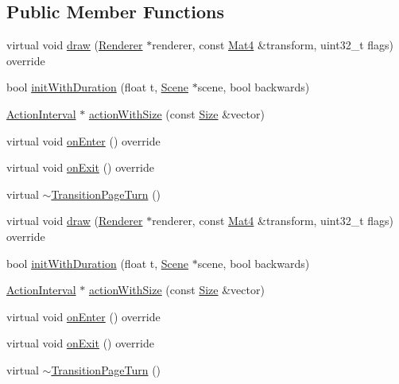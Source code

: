 \subsection*{Public Member Functions}
\begin{DoxyCompactItemize}
\item 
virtual void \hyperlink{classTransitionPageTurn_a1e00260a163de7b41a5827ee9ed34d61}{draw} (\hyperlink{classRenderer}{Renderer} $\ast$renderer, const \hyperlink{classMat4}{Mat4} \&transform, uint32\+\_\+t flags) override
\item 
bool \hyperlink{classTransitionPageTurn_ac01d675bea315c040164639f912401d7}{init\+With\+Duration} (float t, \hyperlink{classScene}{Scene} $\ast$scene, bool backwards)
\item 
\hyperlink{classActionInterval}{Action\+Interval} $\ast$ \hyperlink{classTransitionPageTurn_a5de2062024b8a0dc293d1e4d7b2d8d2a}{action\+With\+Size} (const \hyperlink{classSize}{Size} \&vector)
\item 
virtual void \hyperlink{classTransitionPageTurn_a451cf478d1f344678dde975e0db39b46}{on\+Enter} () override
\item 
virtual void \hyperlink{classTransitionPageTurn_a5c53ecc8cf81db631e7af1c5fa12d942}{on\+Exit} () override
\item 
virtual \hyperlink{classTransitionPageTurn_a96f393e4df05d5a4c9c97daeeecd58d7}{$\sim$\+Transition\+Page\+Turn} ()
\item 
virtual void \hyperlink{classTransitionPageTurn_a2df5e0dc13a58e5ac7c8ce27703bd384}{draw} (\hyperlink{classRenderer}{Renderer} $\ast$renderer, const \hyperlink{classMat4}{Mat4} \&transform, uint32\+\_\+t flags) override
\item 
bool \hyperlink{classTransitionPageTurn_ac01d675bea315c040164639f912401d7}{init\+With\+Duration} (float t, \hyperlink{classScene}{Scene} $\ast$scene, bool backwards)
\item 
\hyperlink{classActionInterval}{Action\+Interval} $\ast$ \hyperlink{classTransitionPageTurn_acb8c14a97f74aaffa0ec7458532a3e7d}{action\+With\+Size} (const \hyperlink{classSize}{Size} \&vector)
\item 
virtual void \hyperlink{classTransitionPageTurn_adb15cf19b760250156d6fa3f2e1dbf31}{on\+Enter} () override
\item 
virtual void \hyperlink{classTransitionPageTurn_adf4182d3e59e362c1ca5beec367d7bf9}{on\+Exit} () override
\item 
virtual \hyperlink{classTransitionPageTurn_a2777c035a3ef06027a0f5167d0d16c52}{$\sim$\+Transition\+Page\+Turn} ()
\end{DoxyCompactItemize}
